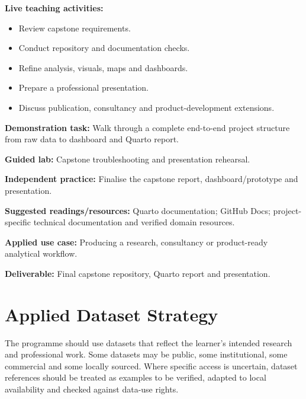 \documentclass[
  a4paper,
]{article}
\providecommand{\tightlist}{%
  \setlength{\itemsep}{0pt}\setlength{\parskip}{0pt}}
\begin{document}
\textbf{Live teaching activities:}

\begin{itemize}
\tightlist
\item
  Review capstone requirements.
\item
  Conduct repository and documentation checks.
\item
  Refine analysis, visuals, maps and dashboards.
\item
  Prepare a professional presentation.
\item
  Discuss publication, consultancy and product-development extensions.
\end{itemize}

\textbf{Demonstration task:} Walk through a complete end-to-end project
structure from raw data to dashboard and Quarto report.

\textbf{Guided lab:} Capstone troubleshooting and presentation
rehearsal.

\textbf{Independent practice:} Finalise the capstone report,
dashboard/prototype and presentation.

\textbf{Suggested readings/resources:} Quarto documentation; GitHub
Docs; project-specific technical documentation and verified domain
resources.

\textbf{Applied use case:} Producing a research, consultancy or
product-ready analytical workflow.

\textbf{Deliverable:} Final capstone repository, Quarto report and
presentation.

\section{Applied Dataset Strategy}\label{applied-dataset-strategy}

The programme should use datasets that reflect the learner's intended
research and professional work. Some datasets may be public, some
institutional, some commercial and some locally sourced. Where specific
access is uncertain, dataset references should be treated as examples to
be verified, adapted to local availability and checked against data-use
rights.
\end{document}
